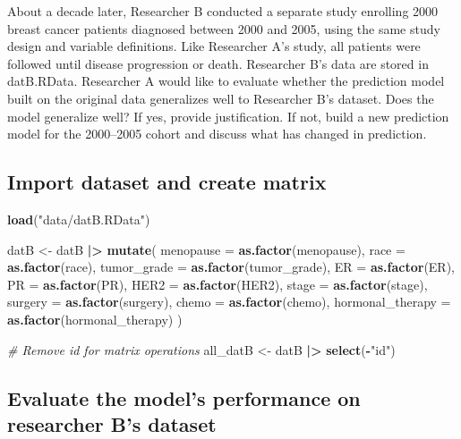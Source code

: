\documentclass[
]{article}
\newenvironment{Shaded}{\begin{snugshade}}{\end{snugshade}}
\newcommand{\AttributeTok}[1]{\textcolor[rgb]{0.13,0.29,0.53}{#1}}
\newcommand{\CommentTok}[1]{\textcolor[rgb]{0.56,0.35,0.01}{\textit{#1}}}
\newcommand{\FunctionTok}[1]{\textcolor[rgb]{0.13,0.29,0.53}{\textbf{#1}}}
\newcommand{\NormalTok}[1]{#1}
\newcommand{\OtherTok}[1]{\textcolor[rgb]{0.56,0.35,0.01}{#1}}
\newcommand{\SpecialCharTok}[1]{\textcolor[rgb]{0.81,0.36,0.00}{\textbf{#1}}}
\newcommand{\StringTok}[1]{\textcolor[rgb]{0.31,0.60,0.02}{#1}}
\begin{document}
About a decade later, Researcher B conducted a separate study enrolling
2000 breast cancer patients diagnosed between 2000 and 2005, using the
same study design and variable definitions. Like Researcher A's study,
all patients were followed until disease progression or death.
Researcher B's data are stored in datB.RData. Researcher A would like to
evaluate whether the prediction model built on the original data
generalizes well to Researcher B's dataset. Does the model generalize
well? If yes, provide justification. If not, build a new prediction
model for the 2000--2005 cohort and discuss what has changed in
prediction.

\subsection{Import dataset and create
matrix}\label{import-dataset-and-create-matrix}

\begin{Shaded}
\begin{Highlighting}[]
\FunctionTok{load}\NormalTok{(}\StringTok{"data/datB.RData"}\NormalTok{)}

\NormalTok{datB }\OtherTok{\textless{}{-}}\NormalTok{ datB }\SpecialCharTok{|\textgreater{}}
  \FunctionTok{mutate}\NormalTok{(}
    \AttributeTok{menopause =} \FunctionTok{as.factor}\NormalTok{(menopause),}
    \AttributeTok{race =} \FunctionTok{as.factor}\NormalTok{(race),}
    \AttributeTok{tumor\_grade =} \FunctionTok{as.factor}\NormalTok{(tumor\_grade),}
    \AttributeTok{ER =} \FunctionTok{as.factor}\NormalTok{(ER),}
    \AttributeTok{PR =} \FunctionTok{as.factor}\NormalTok{(PR),}
    \AttributeTok{HER2 =} \FunctionTok{as.factor}\NormalTok{(HER2),}
    \AttributeTok{stage =} \FunctionTok{as.factor}\NormalTok{(stage),}
    \AttributeTok{surgery =} \FunctionTok{as.factor}\NormalTok{(surgery),}
    \AttributeTok{chemo =} \FunctionTok{as.factor}\NormalTok{(chemo),}
    \AttributeTok{hormonal\_therapy =} \FunctionTok{as.factor}\NormalTok{(hormonal\_therapy)}
\NormalTok{  )}

\CommentTok{\# Remove id for matrix operations}
\NormalTok{all\_datB }\OtherTok{\textless{}{-}}\NormalTok{ datB }\SpecialCharTok{|\textgreater{}} \FunctionTok{select}\NormalTok{(}\SpecialCharTok{{-}}\StringTok{"id"}\NormalTok{)}
\end{Highlighting}
\end{Shaded}

\subsection{Evaluate the model's performance on researcher B's
dataset}\label{evaluate-the-models-performance-on-researcher-bs-dataset}
\end{document}
